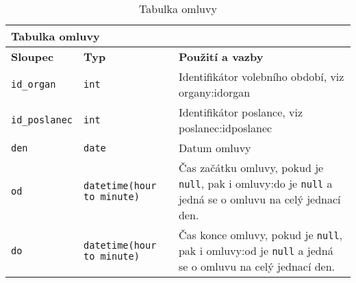\begin{center}
	\begin{longtable}{|l|l|p{7cm}|}
		\caption{Tabulka omluvy} 
		\label{table:omluvy} \\
		
		\hline 
		
		\multicolumn{3}{|l|}{\textbf{Tabulka omluvy}} \\
		
		\hline 
		
		\multicolumn{1}{|l|}{\textbf{Sloupec}} & \multicolumn{1}{l|}{\textbf{Typ}} & \multicolumn{1}{l|}{\textbf{Použití a vazby}} \\ 
		
		\endhead
		
		\hline 
		
		\lstinline|id_organ| & \lstinline|int| & Identifikátor volebního období, viz organy:id\textunderscore organ
		\\
		
		\hline 
		
		\lstinline|id_poslanec| & \lstinline|int| & Identifikátor poslance, viz poslanec:id\textunderscore poslanec
		\\
		
		\hline 
		
		
		\lstinline|den| & \lstinline|date| & Datum omluvy
		\\
		
		\hline 
		
		
		\lstinline|od| & \lstinline|datetime(hour to minute)|	 & Čas začátku omluvy, pokud je \lstinline|null|, pak \linebreak i omluvy:do je \lstinline|null| a jedná se o omluvu na celý jednací den.
		\\
		
		\hline 
		
		
		\lstinline|do| & \lstinline|datetime(hour to minute)|	 & Čas konce omluvy, pokud je \lstinline|null|, pak \linebreak i omluvy:od je \lstinline|null| a jedná se o omluvu na celý jednací den.	\\
		
		\hline 
		
	\end{longtable}
\end{center}